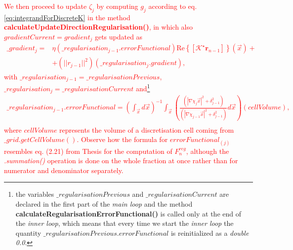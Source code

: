 \documentclass[10pt,a4paper]{article}
\newcommand{\real}[1]{\text{Re} \left\{ #1 \right\}}
\begin{document}
\textcolor{red}{
We then proceed to update $\zeta_j$ by computing $g_j$ according to eq. \eqref{eq:integrandForDiscreteK} in the method \textbf{calculateUpdateDirectionRegularisation()}, in which also $gradientCurrent = gradient_j$ gets updated as 
\begin{align}
\_gradient_j = &\eta (\_regularisation_{j-1}.errorFunctional)\real{[\mathcal{K}^\star\mathbf{r}_{n-1}]}(\vec{x}) + \\
&+ (||r_{j-1}||^2)( \_regularisation_j.gradient),
\end{align}
with $\_regularisation_{j-1} =\_regularisationPrevious$,  $\_regularisation_{j} =\_regularisationCurrent$ and\footnote{the variables $\_regularisationPrevious$ and $\_regularisationCurrent$ are declared in the first part of the \textit{main loop} and the method \textbf{calculateRegularisationErrorFunctional()} is called only at the end of the \textit{inner loop}, which means that every time we start the \textit{inner loop} the quantity $\_regularisationPrevious.errorFunctional$ is reinitialized as a \textit{double  0.0}.}
\begin{align}
\_regularisation_{j-1}.errorFunctional =  (\int_{\vec{x}} d\vec{x})^{-1} \int_{\vec{x}} \left(\frac{(|\nabla \chi_j\vec{x}|^2 +\delta^2_{j-1})}{(|\nabla \chi_{j-1}\vec{x}|^2 +\delta^2_{j-1})}  d\vec{x}\right) (cellVolume), \\
\tag*{( calculateRegularisationErrorFunctional() )}
\end{align}
where $cellVolume$ represents the volume of a discretisation cell coming from $\_grid.getCellVolume()$.
Observe how the formula for $errorFunctional_{(j)} $ resembles eq. (2.21) from Thesis for the computation of $F^{reg}_n$, although the \textit{.summation()} operation is done on the whole fraction at once rather than for numerator and denominator separately.
}
\newline
\end{document}
